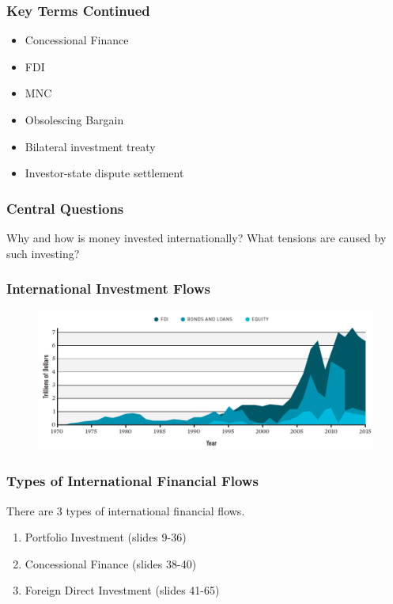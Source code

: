 \documentclass{beamer}
\begin{document}
\begin{frame} 
	\frametitle{\LARGE{Key Terms Continued}}
	\begin{itemize}
		\item Concessional Finance
		\item FDI
		\item MNC
		\item Obsolescing Bargain
		\item Bilateral investment treaty
		\item Investor-state dispute settlement
	\end{itemize}
\end{frame}

\begin{frame} 
\frametitle{\LARGE{Central Questions}}
    \centering
    \Large{Why and how is money invested internationally? What tensions are caused by such investing?}
\end{frame}

\begin{frame} 
\frametitle{\LARGE{International Investment Flows}}
\begin{figure}[ht!]
\centering
\includegraphics[width=\textwidth,height=0.8\textheight]{./invest.png}
\end{figure}
\end{frame}

\begin{frame} 
	\frametitle{\LARGE{Types of International Financial Flows}}
There are 3 types of international financial flows.
	\begin{enumerate}
		\item Portfolio Investment (slides 9-36)
		\item Concessional Finance (slides 38-40)
		\item Foreign Direct Investment	(slides 41-65)  
	\end{enumerate}

\end{frame}
\end{document}
